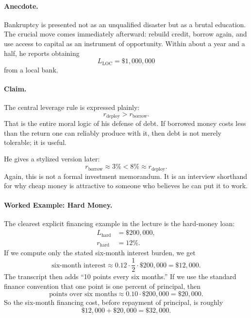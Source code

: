 \paragraph{Anecdote.}
Bankruptcy is presented not as an unqualified disaster but as a brutal education. The crucial move comes immediately afterward: rebuild credit, borrow again, and use access to capital as an instrument of opportunity. Within about a year and a half, he reports obtaining
\begin{equation}
L_{\text{LOC}} = \$1{,}000{,}000
\end{equation}
from a local bank.

\paragraph{Claim.}
The central leverage rule is expressed plainly:
\begin{equation}
r_{\text{deploy}} > r_{\text{borrow}}.
\end{equation}
That is the entire moral logic of his defense of debt. If borrowed money costs less than the return one can reliably produce with it, then debt is not merely tolerable; it is useful.

He gives a stylized version later:
\begin{equation}
r_{\text{borrow}} \approx 3\% < 8\% \approx r_{\text{deploy}}.
\end{equation}
Again, this is not a formal investment memorandum. It is an interview shorthand for why cheap money is attractive to someone who believes he can put it to work.

\paragraph{Worked Example: Hard Money.}
The clearest explicit financing example in the lecture is the hard-money loan:
\begin{align}
L_{\text{hard}} &= \$200{,}000,\\
r_{\text{hard}} &= 12\%.
\end{align}
If we compute only the stated six-month interest burden, we get
\begin{equation}
\text{six-month interest} \approx 0.12 \cdot \frac{1}{2} \cdot \$200{,}000 = \$12{,}000.
\end{equation}
The transcript then adds ``10 points every six months.'' If we use the standard finance convention that one point is one percent of principal, then
\begin{equation}
\text{points over six months} \approx 0.10 \cdot \$200{,}000 = \$20{,}000.
\end{equation}
So the six-month financing cost, before repayment of principal, is roughly
\begin{equation}
\$12{,}000 + \$20{,}000 = \$32{,}000.
\end{equation}

